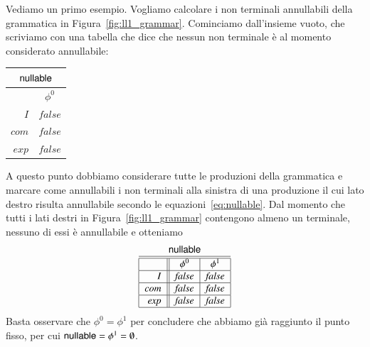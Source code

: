 Vediamo un primo esempio. Vogliamo calcolare i non terminali annullabili
della grammatica in Figura~\ref{fig:ll1_grammar}.
Cominciamo dall'insieme vuoto, che scriviamo con una tabella che dice
che nessun non terminale \`e al momento considerato annullabile:
%
\begin{center}
\begin{tabular}{|r||c|}
\multicolumn{2}{c}{$\mathsf{nullable}$}\\\hline\hline
 & $\phi^0$ \\\hline
$I$ & $\mathit{false}$ \\\hline
$\mathit{com}$ & $\mathit{false}$ \\\hline
$\mathit{exp}$ & $\mathit{false}$\\\hline
\end{tabular}
\end{center}
%
A questo punto dobbiamo considerare tutte le produzioni della grammatica e
marcare come annullabili i non terminali alla sinistra di una produzione
il cui lato destro risulta annullabile secondo le
equazioni~\eqref{eq:nullable}. Dal momento che tutti i lati destri in
Figura~\ref{fig:ll1_grammar} contengono almeno un terminale, nessuno di essi
\`e annullabile e otteniamo
%
\begin{equation}\label{tab:nullable_ll1_grammar}
\mbox{
\begin{tabular}{|r||c|c|}
\multicolumn{3}{c}{$\nullable$}\\\hline\hline
 & $\phi^0$ & $\phi^1$ \\\hline
$I$ & $\mathit{false}$ & $\mathit{false}$ \\\hline
$\mathit{com}$ & $\mathit{false}$ & $\mathit{false}$ \\\hline
$\mathit{exp}$ & $\mathit{false}$ & $\mathit{false}$ \\\hline
\end{tabular}
}
\end{equation}
%
Basta osservare che $\phi^0=\phi^1$ per concludere che abbiamo gi\`a
raggiunto il punto fisso, per cui $\mathsf{nullable}=\phi^1=\emptyset$.

